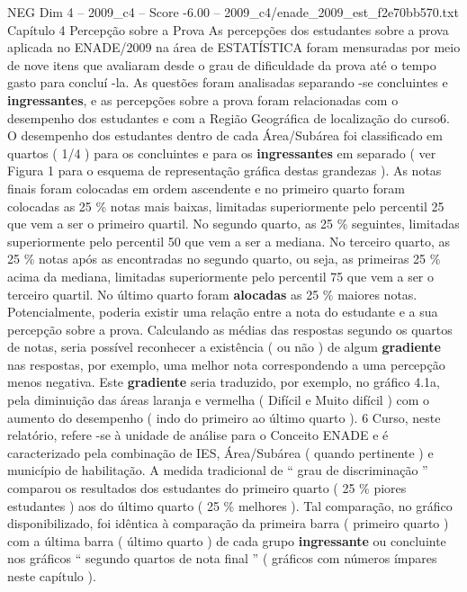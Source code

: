 \begin{textsample}{NEG Dim 4 – 2009\_c4 – Score -6.00 – 2009\_c4/enade\_2009\_est\_f2e70bb570.txt}  \label{ex:f4_neg_030}
Capítulo 4 Percepção sobre a Prova As percepções dos estudantes sobre a prova aplicada no ENADE/2009 na área de ESTATÍSTICA foram mensuradas por meio de nove itens que avaliaram desde o grau de dificuldade da prova até o tempo gasto para concluí -la.
As questões foram analisadas separando -se concluintes e \textbf{ingressantes}, e as percepções sobre a prova foram relacionadas com o desempenho dos estudantes e com a Região Geográfica de localização do curso6.
O desempenho dos estudantes dentro de cada Área/Subárea foi classificado em quartos ( 1/4 ) para os concluintes e para os \textbf{ingressantes} em separado ( ver Figura 1 para o esquema de representação gráfica destas grandezas ).
As notas finais foram colocadas em ordem ascendente e no primeiro quarto foram colocadas as 25 \% notas mais baixas, limitadas superiormente pelo percentil 25 que vem a ser o primeiro quartil.
No segundo quarto, as 25 \% seguintes, limitadas superiormente pelo percentil 50 que vem a ser a mediana.
No terceiro quarto, as 25 \% notas após as encontradas no segundo quarto, ou seja, as primeiras 25 \% acima da mediana, limitadas superiormente pelo percentil 75 que vem a ser o terceiro quartil.
No último quarto foram \textbf{alocadas} as 25 \% maiores notas.
Potencialmente, poderia existir uma relação entre a nota do estudante e a sua percepção sobre a prova.
Calculando as médias das respostas segundo os quartos de notas, seria possível reconhecer a existência ( ou não ) de algum \textbf{gradiente} nas respostas, por exemplo, uma melhor nota correspondendo a uma percepção menos negativa.
Este \textbf{gradiente} seria traduzido, por exemplo, no gráfico 4.1a, pela diminuição das áreas laranja e vermelha ( Difícil e Muito difícil ) com o aumento do desempenho ( indo do primeiro ao último quarto ). 6 Curso, neste relatório, refere -se à unidade de análise para o Conceito ENADE e é caracterizado pela combinação de IES, Área/Subárea ( quando pertinente ) e município de habilitação.
A medida tradicional de “ grau de discriminação ” comparou os resultados dos estudantes do primeiro quarto ( 25 \% piores estudantes ) aos do último quarto ( 25 \% melhores ).
Tal comparação, no gráfico disponibilizado, foi idêntica à comparação da primeira barra ( primeiro quarto ) com a última barra ( último quarto ) de cada grupo \textbf{ingressante} ou concluinte nos gráficos “ segundo quartos de nota final ” ( gráficos com números ímpares neste capítulo ).

\end{textsample}
